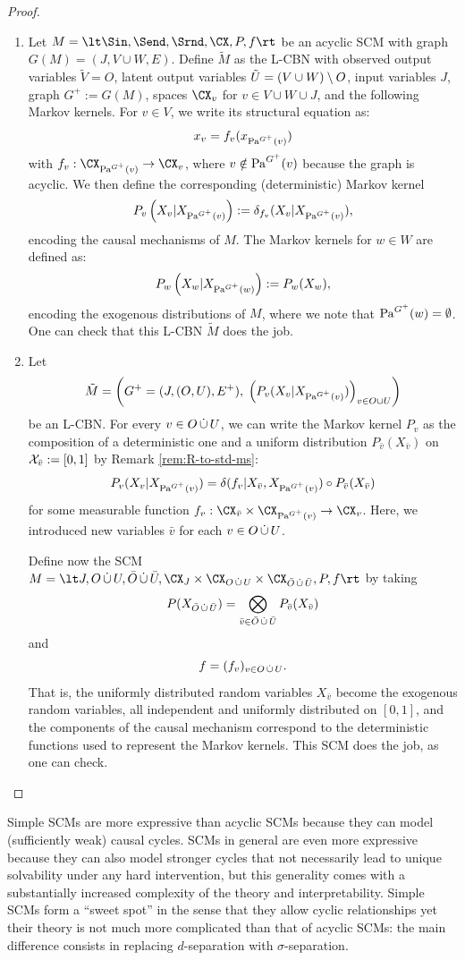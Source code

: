 \begin{proof}
  \begin{enumerate}[label=\roman*)]
    \item
      Let $M = \lt \Sin, \Send, \Srnd, \CX, P, f \rt$ be an acyclic SCM with graph $G(M) = (J, V \cup W, E)$.
      Define $\tilde{M}$ as the L-CBN with observed output variables $\tilde{V} = O$, latent output variables $\tilde{U} = (V \cup W) \setminus O$, input variables $J$, graph $G^+:=G(M)$, spaces $\CX_v$ for $v \in V\cup W \cup J$, and the following Markov kernels.
      For $v \in V$, we write its structural equation as:
      $$x_v = f_v(x_{\mathrm{Pa}^{G^+}(v)})$$
      with $f_v : \CX_{\Pa^{G^+}(v)} \to \CX_v$,
      where $v \notin \mathrm{Pa}^{G^+}(v)$ because the graph is acyclic. We then define the corresponding (deterministic) Markov kernel
      \[ P_v\left ( X_v|X_{\mathrm{Pa}^{G^+}(v)}\right ) := \delta_{f_v}(X_v|X_{\mathrm{Pa}^{G^+}(v)}),\]
      encoding the causal mechanisms of $M$.
      The Markov kernels for $w \in W$ are defined as:
      \[ P_w\left ( X_w|X_{\mathrm{Pa}^{G^+}(w)}\right ) := P_w(X_w),\]
      encoding the exogenous distributions of $M$, where we note that $\mathrm{Pa}^{G^+}(w) = \emptyset$.
      One can check that this L-CBN $\tilde{M}$ does the job.
    \item
      Let 
      \[ \tilde{M} = \left ( G^+=(J,(O,U),E^+), \; \left ( P_v(X_v| X_{\mathrm{Pa}^{G^+}(v)}) \right )_{v\in O \cup U} \right ) \]
      be an L-CBN.
      For every $v \in O \,\dot{\cup}\, U$, we can write the Markov kernel $P_v$ as the composition of a deterministic one and 
      a uniform distribution $P_{\bar v}(X_{\bar v})$ on $\mathcal{X}_{\bar v}:=[0,1]$ by Remark \ref{rem:R-to-std-ms}:
        \[ P_v(X_v|X_{\mathrm{Pa}^{G^+}(v)}) = \delta(f_v|X_{\bar v}, X_{\mathrm{Pa}^{G^+}(v)}) \circ P_{\bar v}(X_{\bar v}) \]
      for some measurable function $f_v : \CX_{\bar v} \times \CX_{\Pa^{G^+}(v)} \to \CX_v$.
      Here, we introduced new variables $\bar v$ for each $v \in O \,\dot{\cup}\, U$.

      Define now the SCM $M = \lt J, O \dcup U, \bar O \dcup \bar U, \CX_J \times \CX_{O \dcup U} \times \CX_{\bar O \dcup \bar U}, P, f \rt$ by taking
      $$P(X_{\bar O \,\dot{\cup}\, \bar U}) = \bigotimes_{\bar v \in \bar O \,\dot{\cup}\, \bar U} P_{\bar v}(X_{\bar v})$$
      and
      $$f = (f_v)_{v \in O \,\dot{\cup}\, U}.$$
      That is, the uniformly distributed random variables $X_{\bar v}$ become the exogenous random variables,
      all independent and uniformly distributed on $[0,1]$, and the components of the causal mechanism correspond to the deterministic functions used to represent the Markov kernels.
      This SCM does the job, as one can check.
  \end{enumerate}
\end{proof}
Simple SCMs are more expressive than acyclic SCMs because they can model (sufficiently
weak) causal cycles. SCMs in general are even more expressive because they can also
model stronger cycles that not necessarily lead to unique solvability under any hard
intervention, but this generality comes with a substantially increased complexity of
the theory and interpretability. Simple SCMs form a ``sweet spot'' in the sense that they allow cyclic
relationships yet their theory is not much more complicated than that of acyclic SCMs:
the main difference consists in replacing $d$-separation with $\sigma$-separation.

